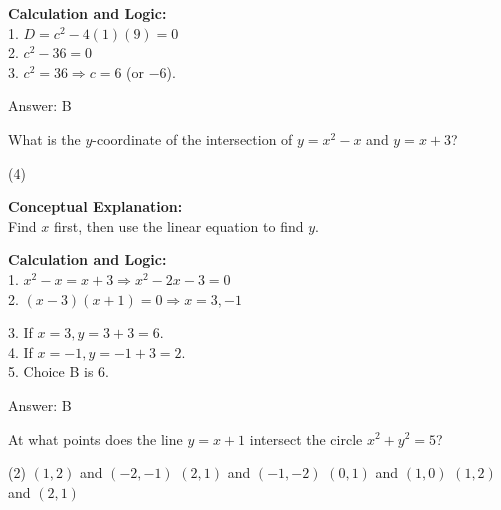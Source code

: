 \documentclass[11pt,paper=a4,answers]{exam}
\begin{document}
\begin{questions}
\begin{solution}
\vspace{20pt}

\textbf{Calculation and Logic:} \\
1. $D = c^2 - 4(1)(9) = 0$ \\
2. $c^2 - 36 = 0$ \\
3. $c^2 = 36 \Rightarrow c = 6$ (or $-6$).

\vspace{25pt}

Answer: \colorbox{yellow!100}{B}
\end{solution}

\vspace{40pt}

\question
What is the $y$-coordinate of the intersection of $y = x^2 - x$ and $y = x + 3$?
\begin{tasks}(4)
\end{tasks}

\begin{solution}
\textbf{Conceptual Explanation:} \\
Find $x$ first, then use the linear equation to find $y$.

\vspace{20pt}

\textbf{Calculation and Logic:} \\
1. $x^2 - x = x + 3 \Rightarrow x^2 - 2x - 3 = 0$ \\
2. $(x - 3)(x + 1) = 0 \Rightarrow x = 3, -1$

\vspace{10pt}

3. If $x = 3, y = 3 + 3 = 6$. \\
4. If $x = -1, y = -1 + 3 = 2$. \\
5. Choice B is 6.

\vspace{25pt}

Answer: \colorbox{yellow!100}{B}
\end{solution}

\vspace{40pt}

\question
At what points does the line $y = x + 1$ intersect the circle $x^2 + y^2 = 5$?
\begin{tasks}(2)
    \task $(1, 2)$ and $(-2, -1)$
    \task $(2, 1)$ and $(-1, -2)$
    \task $(0, 1)$ and $(1, 0)$
    \task $(1, 2)$ and $(2, 1)$
\end{tasks}


\end{questions}
\end{document}
